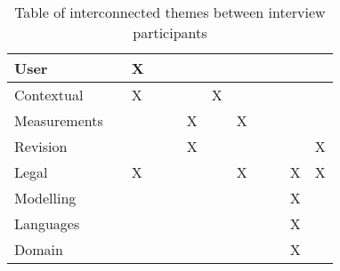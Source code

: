 \begin{table}[H]
{\begin{tabular}{|l|l|l|l|l|l|l|l|l|l|l|l|}
User                            &     & X   &     &     &     &     &     &     &     &      &      \\ \hline
Contextual                      &     & X   &     &     &     & X   &     &     &     &      &      \\ \hline
Measurements                    &     &     &     &     & X   &     & X   &     &     &      &      \\ \hline
Revision                        &     &     &     &     & X   &     &     &     &     &      & X    \\ \hline
Legal                           &     & X   &     &     &     &     & X   &     &     & X    & X    \\ \hline
Modelling                       &     &     &     &     &     &     &     &     &     & X    &      \\ \hline
Languages                       &     &     &     &     &     &     &     &     &     & X    &      \\ \hline
Domain                          &     &     &     &     &     &     &     &     &     & X    &      \\ \hline
\end{tabular}%
}
\caption{Table of interconnected themes between interview participants}
\label{tab:interconnected_themes}
\end{table}

